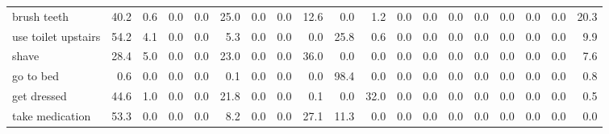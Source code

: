 \documentclass{article}
\begin{document}
\begin{sideways}
\begin{tabular}{lrrrrrrrrrrrrrrrrrr}
brush teeth                   &        40.2 &                0.6 &           0.0 &                          0.0 &               25.0 &                0.0 &                        0.0 &         12.6 &              0.0 &                1.2 &                    0.0 &                      0.0 &                  0.0 &                   0.0 &              0.0 &              0.0 &                                  0.0 &         20.3 \\
use toilet upstairs           &        54.2 &                4.1 &           0.0 &                          0.0 &                5.3 &                0.0 &                        0.0 &          0.0 &             25.8 &                0.6 &                    0.0 &                      0.0 &                  0.0 &                   0.0 &              0.0 &              0.0 &                                  0.0 &          9.9 \\
shave                         &        28.4 &                5.0 &           0.0 &                          0.0 &               23.0 &                0.0 &                        0.0 &         36.0 &              0.0 &                0.0 &                    0.0 &                      0.0 &                  0.0 &                   0.0 &              0.0 &              0.0 &                                  0.0 &          7.6 \\
go to bed                     &         0.6 &                0.0 &           0.0 &                          0.0 &                0.1 &                0.0 &                        0.0 &          0.0 &             98.4 &                0.0 &                    0.0 &                      0.0 &                  0.0 &                   0.0 &              0.0 &              0.0 &                                  0.0 &          0.8 \\
get dressed                   &        44.6 &                1.0 &           0.0 &                          0.0 &               21.8 &                0.0 &                        0.0 &          0.1 &              0.0 &               32.0 &                    0.0 &                      0.0 &                  0.0 &                   0.0 &              0.0 &              0.0 &                                  0.0 &          0.5 \\
take medication               &        53.3 &                0.0 &           0.0 &                          0.0 &                8.2 &                0.0 &                        0.0 &         27.1 &             11.3 &                0.0 &                    0.0 &                      0.0 &                  0.0 &                   0.0 &              0.0 &              0.0 &                                  0.0 &          0.0 \\

\end{tabular}
\end{sideways}
\end{document}
